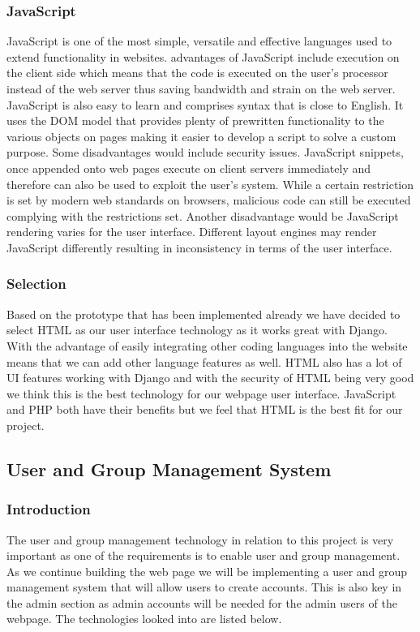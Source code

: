 \documentclass[draftclsnofoot,10pt,onecolumn]{IEEEtran} %
\begin{document}
\subsubsection{JavaScript}
JavaScript is one of the most simple, versatile and effective languages used to extend functionality in websites. advantages of
JavaScript include execution on the client side which means that the code is executed on the user's processor instead of the
web server thus saving bandwidth and strain on the web server. JavaScript is also easy to learn and comprises syntax that is
close to English. It uses the DOM model that provides plenty of prewritten functionality to the various objects on pages
making it easier to develop a script to solve a custom purpose. Some disadvantages would include security issues. JavaScript
snippets, once appended onto web pages execute on client servers immediately and therefore can also be used to exploit the
user's system. While a certain restriction is set by modern web standards on browsers, malicious code can still be executed
complying with the restrictions set. Another disadvantage would be JavaScript rendering varies for the user interface.
Different layout engines may render JavaScript differently resulting in inconsistency in terms of the user interface. \\

\subsubsection{Selection}
Based on the prototype that has been implemented already we have decided to select HTML as our user interface technology
as it works great with Django. With the advantage of easily integrating other coding languages into the website means that
we can add other language features as well. HTML also has a lot of UI features working with Django and with the security of
HTML being very good we think this is the best technology for our webpage user interface. JavaScript and PHP both have
their benefits but we feel that HTML is the best fit for our project. \\

\subsection{User and Group Management System}

\subsubsection{Introduction}
The user and group management technology in relation to this project is very important as one of the requirements is to
enable user and group management. As we continue building the web page we will be implementing a user and group
management system that will allow users to create accounts. This is also key in the admin section as admin accounts will be
needed for the admin users of the webpage. The technologies looked into are listed below.
\end{document}

